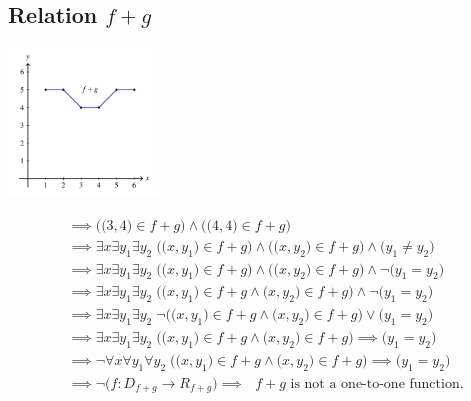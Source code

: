 \documentclass[12pt, letterpaper]{article}
\begin{document}
        \subsection{Relation \(f+g\) }
        \begin{center}
            \includegraphics[width=0.3\textwidth]{relation_f+g.png}
        \end{center}
        \begin{align*}
            & \implies \Big(\big(3, 4\big) \in f+g\Big) \wedge \Big(\big(4, 4\big) \in f+g\Big) \\ 
            & \implies \exists x \exists y_1 \exists y_2 \; \Big( \big(x, y_1\big) \in f+g \Big) \wedge
                                                   \Big( \big(x, y_2\big) \in f+g \Big) \wedge
                                                   \Big( y_1 \neq y_2 \Big) \\
            & \implies \exists x \exists y_1 \exists y_2 \; \Big( \big(x, y_1\big) \in f+g \Big) \wedge
                                                   \Big( \big(x, y_2\big) \in f+g \Big) \wedge
                                                   \neg\Big( y_1 = y_2 \Big) \\
            & \implies \exists x \exists y_1 \exists y_2 \; \Big( \big(x, y_1\big) \in f+g \wedge
                                                   \big(x, y_2\big) \in f+g \Big) \wedge
                                                   \neg\Big( y_1 = y_2 \Big) \\
            & \implies \exists x \exists y_1 \exists y_2 \; \neg\Big( \big(x, y_1\big) \in f+g \wedge
                                                   \big(x, y_2\big) \in f+g \Big) \lor
                                                   \Big( y_1 = y_2 \Big) \\
            & \implies \exists x \exists y_1 \exists y_2 \; \Big( \big(x, y_1\big) \in f+g \wedge
                                                   \big(x, y_2\big) \in f+g \Big) \implies
                                                   \Big( y_1 = y_2 \Big) \\
            & \implies \neg\forall x \forall y_1 \forall y_2 \; \Big( \big(x, y_1\big) \in f+g \wedge
                                                   \big(x, y_2\big) \in f+g \Big) \implies
                                                   \Big( y_1 = y_2 \Big) \\
            & \implies \neg\Big( f : D_{f+g} \to R_{f+g} \Big)
              \implies \text{ \(f+g\) is not a one-to-one function.}
        \end{align*}

    
\end{document}
